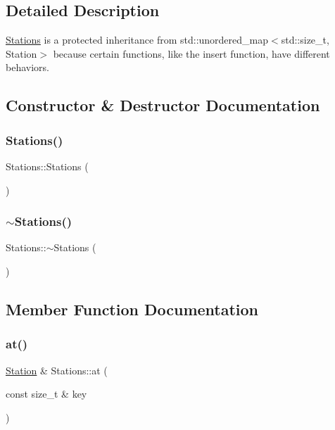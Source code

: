 \subsection{Detailed Description}
\mbox{\hyperlink{class_stations}{Stations}} is a protected inheritance from std\+::unordered\+\_\+map$<$std\+::size\+\_\+t, Station$>$ because certain functions, like the insert function, have different behaviors. 

\subsection{Constructor \& Destructor Documentation}
\mbox{\label{class_stations_a4e0f8fc4709bd680154b7be896ca2350}} 
\subsubsection{\texorpdfstring{Stations()}{Stations()}}
{\footnotesize\ttfamily Stations\+::\+Stations (\begin{DoxyParamCaption}{ }\end{DoxyParamCaption})}

\mbox{\label{class_stations_a9d17c76f77babd7e88adf95112825b1d}} 
\subsubsection{\texorpdfstring{$\sim$\+Stations()}{~Stations()}}
{\footnotesize\ttfamily Stations\+::$\sim$\+Stations (\begin{DoxyParamCaption}{ }\end{DoxyParamCaption})\hspace{0.3cm}{\ttfamily [virtual]}}



\subsection{Member Function Documentation}
\mbox{\label{class_stations_a1d2abb378db9aa8deb9f7b54aefac2dd}} 
\subsubsection{\texorpdfstring{at()}{at()}\hspace{0.1cm}{\footnotesize\ttfamily [1/4]}}
{\footnotesize\ttfamily \mbox{\hyperlink{class_station}{Station}} \& Stations\+::at (\begin{DoxyParamCaption}\item[{const size\+\_\+t \&}]{key }\end{DoxyParamCaption})}

